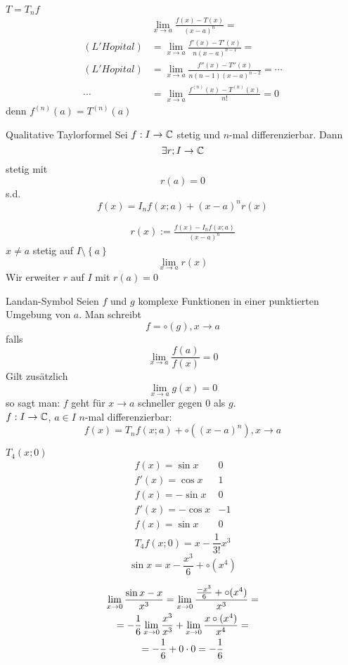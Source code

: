 \begin{Bew}
  $T=T_nf$
  \begin{align*}
    &\lim_{x\to a}\frac{f(x)-T(x)}{(x-a)^n}=\\
    (L'Hopital)& = \lim_{x\to a}\frac{f'(x)-T'(x)}{n(x-a)^{n-1}}=\\
    (L'Hopital)& = \lim_{x\to a}\frac{f''(x)-T''(x)}{n(n-1)(x-a)^{n-2}}=\cdots\\
    \cdots&=\lim_{x\to a}\frac{f^{(n)}(x)-T^{(n)}(x)}{n!}=0
  \end{align*}
  denn $f^{(n)}(a)=T^{(n)}(a)$
\end{Bew}
\begin{Kor}{Qualitative Taylorformel}
  Sei $f:I\to\mathbb{C}$ stetig und $n$-mal differenzierbar. Dann
  \[\exists r;I\to\mathbb{C}\]
  stetig mit
  \[r(a)=0\]
  s.d.
  \[f(x)=I_nf(x;a)+(x-a)^nr(x)\]
\end{Kor}
\begin{Bew}
  \begin{gather*}
    r(x):=\frac{f(x)-I_nf(x;a)}{(x-a)^n}
  \end{gather*}
  $x\neq a$ stetig auf $I\setminus \left\{ a \right\}$
  \[\lim_{x\to a}r(x)\]
  Wir erweiter $r$ auf $I$ mit $r(a)=0$
\end{Bew}
\begin{Not}{Landan-Symbol}
  Seien $f$ und $g$ komplexe Funktionen in einer punktierten Umgebung von $a$. Man schreibt
  \[f=\circ(g),x\to a\]
  falls
  \[\lim_{x\to a}\frac{f(a)}{f(x)}=0\]
  Gilt zusätzlich
  \[\lim_{x\to a}g(x) =0\]
  so sagt man: $f$ geht für $x\to a$ schneller gegen 0 als $g$.\\
  $f:I\to\mathbb{C}$, $a\in I$ $n$-mal differenzierbar:
  \[f(x)=T_nf(x;a)+\circ\left( (x-a)^n \right),x\to a\]
\end{Not}
\begin{Bsp}
  $T_4(x;0)$
  \begin{align*}
    f(x)=\sin x& 0\\
    f'(x)=\cos x& 1\\
    f(x)=-\sin x& 0\\
    f'(x)=-\cos x& -1\\
    f(x)=\sin x& 0
  \end{align*}
  \[T_4f(x;0)=x-\frac{1}{3!}x^3\]
  \[\sin x=x-\frac{x^3}{6}+\circ(x^4)\]
\end{Bsp}
\begin{Bsp}
  \begin{gather*}
    \displaystyle\lim_{x\rightarrow0}\frac{\sin x-x}{x^3}=\displaystyle\lim_{x\rightarrow0}\frac{\frac{-x^3}{6}+\circ(x^4)}{x^3}=\\
    =-\frac{1}{6}\displaystyle\lim_{x\rightarrow0}\frac{x^3}{x^3}+\displaystyle\lim_{x\rightarrow0}\frac{x\circ(x^4)}{x^4}=\\
    =-\frac{1}{6}+0\cdot 0=-\frac{1}{6}
  \end{gather*}
\end{Bsp}
